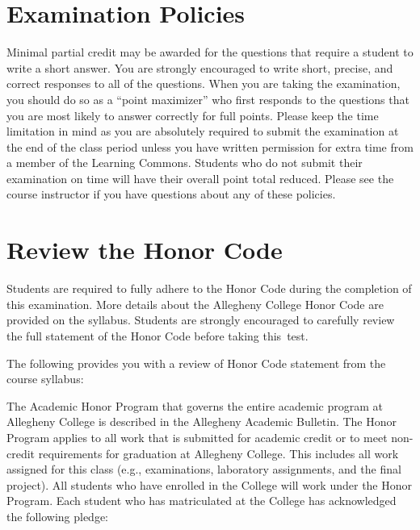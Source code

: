 \vspace*{-.05in}
\section*{Examination Policies}

\vspace*{-.05in}
\noindent Minimal partial credit may be awarded for the questions that require a student to write a short answer. You
are strongly encouraged to write short, precise, and correct responses to all of the questions. When you are taking the
examination, you should do so as a ``point maximizer'' who first responds to the questions that you are most likely to
answer correctly for full points. Please keep the time limitation in mind as you are absolutely required to submit the
examination at the end of the class period unless you have written permission for extra time from a member of the
Learning Commons. Students who do not submit their examination on time will have their overall point total reduced.
Please see the course instructor if you have questions about any of these policies.

\vspace*{-.2in}
\section*{Review the Honor Code}
\vspace*{-.1in}

\noindent Students are required to fully adhere to the Honor Code during the completion of this examination. More
details about the Allegheny College Honor Code are provided on the syllabus. Students are strongly encouraged to
carefully review the full statement of the Honor Code before taking \mbox{this test}.

\noindent The following provides you with a review of Honor Code statement from the course syllabus:

The Academic Honor Program that governs the entire academic program at Allegheny College is described in the Allegheny
Academic Bulletin.  The Honor Program applies to all work that is submitted for academic credit or to meet non-credit
requirements for graduation at Allegheny College.  This includes all work assigned for this class (e.g., examinations,
laboratory assignments, and the final project).  All students who have enrolled in the College will work under the Honor
Program.  Each student who has matriculated at the College has acknowledged the following pledge:

